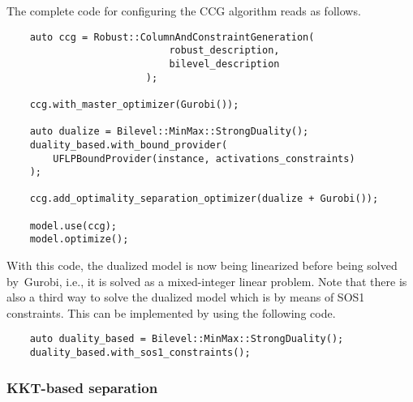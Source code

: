 The complete code for configuring the CCG algorithm reads as follows. 

\begin{lstlisting}
    auto ccg = Robust::ColumnAndConstraintGeneration(
                            robust_description,
                            bilevel_description
                        );
    
    ccg.with_master_optimizer(Gurobi());

    auto dualize = Bilevel::MinMax::StrongDuality();
    duality_based.with_bound_provider(
        UFLPBoundProvider(instance, activations_constraints)
    );

    ccg.add_optimality_separation_optimizer(dualize + Gurobi());

    model.use(ccg);
    model.optimize();
\end{lstlisting}

With this code, the dualized model is now being linearized before being solved
by~\textsf{Gurobi}, i.e., it is solved as a mixed-integer linear problem. Note
that there is also a third way to solve the dualized model which is by means
of SOS1 constraints. This can be implemented by using the following code. 
%
\begin{lstlisting}
    auto duality_based = Bilevel::MinMax::StrongDuality();
    duality_based.with_sos1_constraints();
\end{lstlisting} 

\subsubsection{KKT-based separation}

